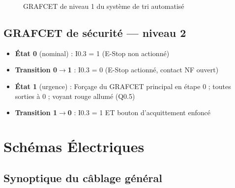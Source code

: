 \documentclass[12pt, a4paper]{report}
\begin{document}
\begin{figure}[H]
  \caption{GRAFCET de niveau 1 du syst\`eme de tri automatis\'e}
  \label{fig:grafcet}
\end{figure}

\section{GRAFCET de s\'ecurit\'e --- niveau 2}

\begin{infobox}
  \begin{itemize}
    \item \textbf{\'Etat 0} (nominal) : I0.3 = 1 (E-Stop non actionn\'e)
    \item \textbf{Transition 0$\rightarrow$1} : I0.3 = 0 (E-Stop actionn\'e, contact NF ouvert)
    \item \textbf{\'Etat 1} (urgence) : For\c{c}age du GRAFCET principal en \'etape 0 ;
          toutes sorties \`a 0 ; voyant rouge allum\'e (Q0.5)
    \item \textbf{Transition 1$\rightarrow$0} : I0.3 = 1 ET bouton d'acquittement enfonc\'e
  \end{itemize}
\end{infobox}

\chapter{Sch\'emas \'Electriques}
\label{chap:schema}

\section{Synoptique du c\^ablage g\'en\'eral}
\end{document}
